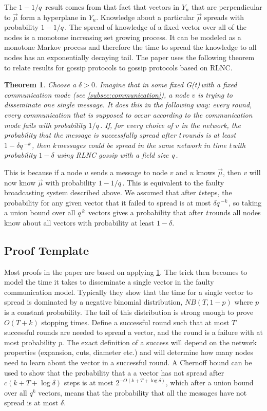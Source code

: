 \documentclass{article} %
\newtheorem{theorem}{Theorem}
\def\graph{\textit{G(t)}\,}
\def\graphtime{\textit{t}\,}
\def\numMessages{\textit{k}\,}
\def\fieldSize{\textit{q}\,}
\begin{document}
The $1-1/\fieldSize$ result comes from that fact that vectors in $Y_u$ that are perpendicular to $\vec{\mu}$ form a hyperplane in $Y_u$. Knowledge about a particular $\vec{\mu}$ spreads with probability $1-1/\fieldSize$. The spread of knowledge of a fixed vector over all of the nodes is a monotone increasing set growing process. It can be modeled as a monotone Markov process and therefore the time to spread the knowledge to all nodes has an exponentially decaying tail. The paper uses the following theorem to relate results for gossip protocols to gossip protocols based on RLNC. 
\begin{theorem}\label{theorem:template}
Choose a $\delta > 0$. Imagine that in some fixed \graph with a fixed communication mode (see \ref{subsec:communication}), a node $v$ is trying to disseminate one single message. It does this in the following way: every round, every communication that is supposed to occur according to the communication mode fails with probability $1/\fieldSize$. If, for every choice of $v$ in the network, the probability that the message is successfully spread after \graphtime rounds is at least $1-\delta\fieldSize^{-\numMessages}$, then \numMessages messages could be spread in the same network in time \graphtime with probability $1-\delta$ using RLNC gossip with a field size \fieldSize. 
\end{theorem}
This is because if a node $u$ sends a message to node $v$ and $u$ knows $\vec{\mu}$, then $v$ will now know $\vec{\mu}$ with probability $1-1/\fieldSize$. This is equivalent to the faulty broadcasting system described above. We assumed that after \graphtime steps, the probability for any given vector that it failed to spread is at most $\delta\fieldSize^{-\numMessages}$, so taking a union bound over all $\fieldSize^{\numMessages}$ vectors gives a probability that after \graphtime rounds all nodes know about all vectors with probability at least $1-\delta$.

\subsection{Proof Template}\label{subsec:template}
Most proofs in the paper are based on applying \ref{theorem:template}. The trick then becomes to model the time it takes to disseminate a single vector in the faulty communication model. Typically they show that the time for a single vector to spread is dominated by a negative binomial distribution, $NB(T,1-p)$ where $p$ is a constant probability. The tail of this distribution is strong enough to prove $O(T+k)$ stopping times. Define a successful round such that at most $T$ successful rounds are needed to spread a vector, and the round is a failure with at most probability $p$. The exact definition of a success will depend on the network properties (expansion, cuts, diameter etc.) and will determine how many nodes need to learn about the vector in a successful round. A Chernoff bound can be used to show that the probability that a a vector has not spread after $c(k+T+\log{\delta})$ steps is at most $2^{-O(k+T+\log{\delta})}$, which after a union bound over all $q^k$ vectors, means that the probability that all the messages have not spread is at most $\delta$. 
\end{document}
